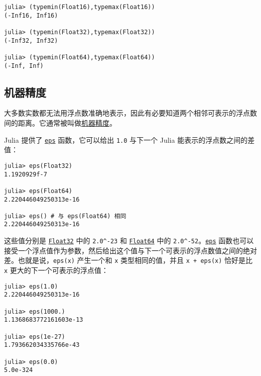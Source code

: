 \begin{verbatim}
julia> (typemin(Float16),typemax(Float16))
(-Inf16, Inf16)

julia> (typemin(Float32),typemax(Float32))
(-Inf32, Inf32)

julia> (typemin(Float64),typemax(Float64))
(-Inf, Inf)
\end{verbatim}



\hypertarget{7614874233242990296}{}


\subsection{机器精度}



大多数实数都无法用浮点数准确地表示，因此有必要知道两个相邻可表示的浮点数间的距离。它通常被叫做\href{https://en.wikipedia.org/wiki/Machine\_epsilon}{机器精度}。



Julia 提供了 \hyperlink{11007691776383983215}{\texttt{eps}} 函数，它可以给出 \texttt{1.0} 与下一个 Julia 能表示的浮点数之间的差值：




\begin{verbatim}
julia> eps(Float32)
1.1920929f-7

julia> eps(Float64)
2.220446049250313e-16

julia> eps() # 与 eps(Float64) 相同
2.220446049250313e-16
\end{verbatim}



这些值分别是 \hyperlink{8101639384272933082}{\texttt{Float32}} 中的 \texttt{2.0{\textasciicircum}-23} 和 \hyperlink{5027751419500983000}{\texttt{Float64}} 中的 \texttt{2.0{\textasciicircum}-52}。\hyperlink{11007691776383983215}{\texttt{eps}} 函数也可以接受一个浮点值作为参数，然后给出这个值与下一个可表示的浮点数值之间的绝对差。也就是说，\texttt{eps(x)} 产生一个和 \texttt{x} 类型相同的值，并且  \texttt{x + eps(x)} 恰好是比 \texttt{x} 更大的下一个可表示的浮点值：




\begin{verbatim}
julia> eps(1.0)
2.220446049250313e-16

julia> eps(1000.)
1.1368683772161603e-13

julia> eps(1e-27)
1.793662034335766e-43

julia> eps(0.0)
5.0e-324
\end{verbatim}



